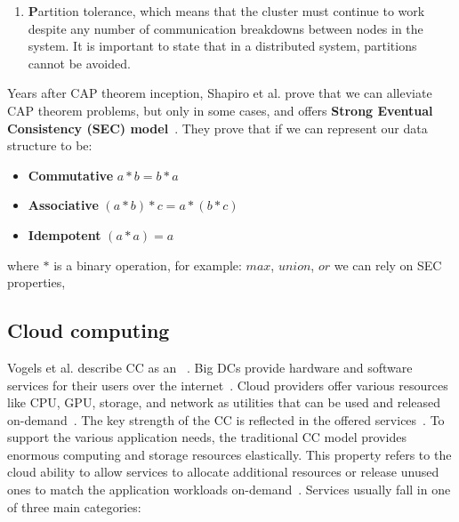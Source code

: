 \begin{enumerate} [start=1,label={(\bfseries \arabic*)}]
	\noindent
	We can calculate availability class if we have system availability $A$, the system's availability class is defined as~\cite{GrayS91}: 
	
	\begin{equation} 
		e^{\log_{10} \frac{1}{ (1 - A)}} 
	\end{equation}
	It is important to notice that even a 99\% available system gives almost four days of downtime in a year, which is unacceptable for services like Facebook, Google, AWS, etc. And when service is down, companies are losing customers.
	\item \textbf{P}artition tolerance, which means that the cluster must continue to work despite any number of communication breakdowns between nodes in the system. It is important to state that in a distributed system, partitions cannot be avoided.
\end{enumerate}

\noindent
Years after CAP theorem inception, Shapiro et al. prove that we can alleviate CAP theorem problems, but only in some cases, and offers \textbf{Strong Eventual Consistency (SEC) model}~\cite{ShapiroPBZ11}. They prove that if we can represent our data structure to be: \label{crdts}

\begin{itemize}
	\item \textbf{Commutative} $a*b = b*a$ 
	\item \textbf{Associative} $(a*b)*c = a*(b*c)$ 
	\item \textbf{Idempotent} $(a * a) = a$ 
\end{itemize}

\noindent
where $*$ is a binary operation, for example: $max$, $union$, $or$ we can rely on SEC properties,
%
%
\subsection{Cloud computing}\label{sec:cloud_computing}
%
Vogels et al. describe CC as an ~\cite{Vogels}.  Big DCs provide hardware and software services for their users over the internet~\cite{AboveTheCloud}. Cloud providers offer various resources like CPU, GPU, storage, and network as utilities that can be used and released on-demand~\cite{ZhangCB10}. The key strength of the CC is reflected in the offered services~\cite{Vogels}. To support the various application needs, the traditional CC model provides enormous computing and storage resources elastically. This property refers to the cloud ability to allow services to allocate additional resources or release unused ones to match the application workloads on-demand~\cite{AssuncaoVB18}. Services usually fall in one of three main categories: 


